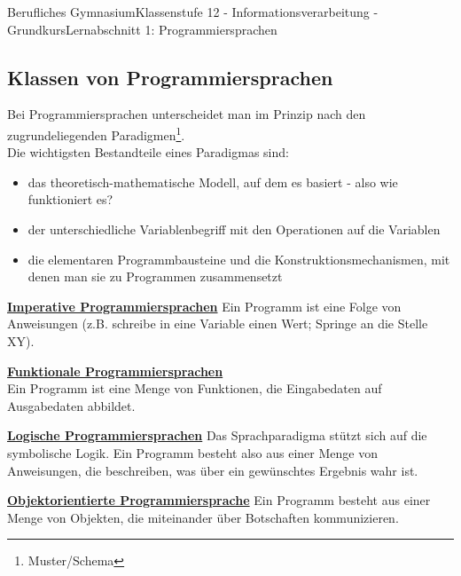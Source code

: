 \documentclass[11pt,oneside,openany,headings=optiontotoc,11pt,numbers=noenddot]{article}
\begin{document}
\begin{worksheet}{Berufliches Gymnasium}{Klassenstufe 12 - Informationsverarbeitung - Grundkurs}{Lernabschnitt 1: Programmiersprachen}
		\subsection{Klassen von Programmiersprachen}
		Bei Programmiersprachen unterscheidet man im Prinzip nach den zugrundeliegenden Paradigmen\footnote{Muster/Schema}.\\
		Die wichtigsten Bestandteile eines Paradigmas sind:
		\begin{itemize}
			\item das theoretisch-mathematische Modell, auf dem es basiert - also wie funktioniert es?
			\item der unterschiedliche Variablenbegriff mit den Operationen auf die Variablen
			\item die elementaren Programmbausteine und die Konstruktionsmechanismen, mit denen man sie zu Programmen zusammensetzt
		\end{itemize}
		\textbf{\underline{Imperative Programmiersprachen}}
		Ein Programm ist eine Folge von Anweisungen (z.B. schreibe in eine Variable einen Wert; Springe an die Stelle XY).\\
		\par\noindent
		\textbf{\underline{Funktionale Programmiersprachen}}\\
		Ein Programm ist eine Menge von Funktionen, die Eingabedaten auf Ausgabedaten abbildet.\\
		\par\noindent
		\textbf{\underline{Logische Programmiersprachen}}
		Das Sprachparadigma stützt sich auf die symbolische Logik. Ein Programm besteht also aus einer Menge von Anweisungen, die beschreiben, was über ein gewünschtes Ergebnis wahr ist.\\
		\par\noindent
		\textbf{\underline{Objektorientierte Programmiersprache}}
		Ein Programm besteht aus einer Menge von Objekten, die miteinander über Botschaften kommunizieren.
	\end{worksheet}
\end{document}
